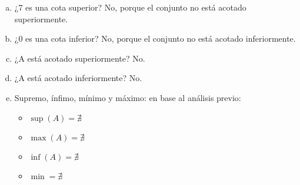 \documentclass{article}
\begin{document}
\begin{enumerate}[(a)]

\item ¿7 es una cota superior? No, porque el conjunto no está acotado superiormente.

\item ¿0 es una cota inferior? No, porque el conjunto no está acotado inferiormente.

\item ¿A está acotado superiormente? No.

\item ¿A está acotado inferiormente? No.

\item Supremo, ínfimo, mínimo y máximo: en base al análisis previo:

\begin{itemize}

\item $ \mathop{sup}(A) = \nexists $

\item $ \mathop{max}(A) = \nexists $

\item $ \mathop{inf}(A) = \nexists $

\item $ \mathop{min(A)} = \nexists $
 
\end{itemize}

\end{enumerate}
\end{document}
